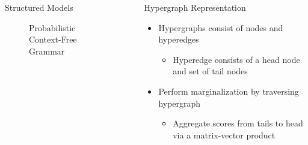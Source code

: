 \documentclass{beamer}
\newlength{\sepwid}
\newlength{\onecolwid}
\begin{document}
\begin{frame}
\begin{columns}[t]
\begin{column}{\onecolwid}
\begin{block}{Structured Models}
\begin{figure}
\begin{center}
{
}

\end{center}
\caption{Probabilistic Context-Free Grammar}
\end{figure}
\end{block}


\end{column} %

\begin{column}{\sepwid}\end{column} %

\begin{column}{\onecolwid} %


\begin{block}{Hypergraph Representation}

\begin{itemize}
\item Hypergraphs consist of nodes and hyperedges
    \begin{itemize}
    \item Hyperedge consists of a head node and set of tail nodes
    \end{itemize}
\vspace{1em}
\item Perform marginalization by traversing hypergraph
    \begin{itemize}
    \item Aggregate scores from tails to head via a matrix-vector product
    \end{itemize}
\end{itemize}

\begin{figure}
\begin{center}

\end{center}
\end{figure}
\end{block}
\end{column}
\end{columns}
\end{frame}
\end{document}
